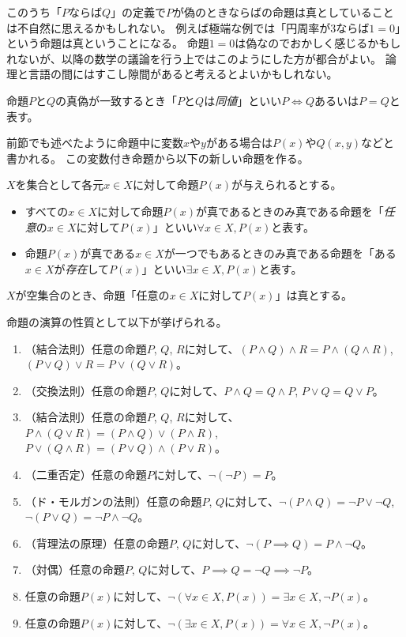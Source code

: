 このうち「$P$ならば$Q$」の定義で$P$が偽のときならばの命題は真としていることは不自然に思えるかもしれない。
例えば極端な例では「円周率が$3$ならば$1 = 0$」という命題は真ということになる。
命題$1 = 0$は偽なのでおかしく感じるかもしれないが、以降の数学の議論を行う上ではこのようにした方が都合がよい。
論理と言語の間にはすこし隙間があると考えるとよいかもしれない。


命題$P$と$Q$の真偽が一致するとき「$P$と$Q$は\emph{同値}」といい$P \iff Q$あるいは$P = Q$と表す。

前節でも述べたように命題中に変数$x$や$y$がある場合は$P(x)$や$Q(x, y)$などと書かれる。
この変数付き命題から以下の新しい命題を作る。

\begin{definition}[全称と存在]
$X$を集合として各元$x \in X$に対して命題$P(x)$が与えられるとする。
\begin{itemize}
\item
すべての$x \in X$に対して命題$P(x)$が真であるときのみ真である命題を「\emph{任意}の$x \in X$に対して$P(x)$」といい$\forall x \in X, P(x)$と表す。
\item
命題$P(x)$が真である$x \in X$が一つでもあるときのみ真である命題を「ある$x \in X$が\emph{存在}して$P(x)$」といい$\exists x \in X, P(x)$と表す。
\end{itemize}
\end{definition}

\begin{remark}
$X$が空集合のとき、命題「任意の$x \in X$に対して$P(x)$」は真とする。
\end{remark}

命題の演算の性質として以下が挙げられる。
\begin{enumerate}
\item
（結合法則）任意の命題$P$, $Q$, $R$に対して、$(P \land Q) \land R = P \land (Q \land R)$, $(P \lor Q) \lor R = P \lor (Q \lor R)$。
\item
（交換法則）任意の命題$P$, $Q$に対して、$P \land Q = Q \land P$, $P \lor Q = Q \lor P$。
\item
（結合法則）任意の命題$P$, $Q$, $R$に対して、$P \land (Q \lor R) = (P \land Q) \lor (P \land R)$, $P \lor (Q \land R) = (P \lor Q) \land (P \lor R)$。
\item
（二重否定）任意の命題$P$に対して、$\neg (\neg P) = P$。
\item
（ド・モルガンの法則）任意の命題$P$, $Q$に対して、$\neg (P \land Q) = \neg P \lor \neg Q$, $\neg (P \lor Q) = \neg P \land \neg Q$。
\item
（背理法の原理）任意の命題$P$, $Q$に対して、$\neg (P \implies Q) = P \land \neg Q$。
\item
（対偶）任意の命題$P$, $Q$に対して、$P \implies Q = \neg Q \implies \neg P$。
\item
任意の命題$P(x)$に対して、$\neg (\forall x \in X, P(x)) = \exists x \in X, \neg P(x)$。
\item
任意の命題$P(x)$に対して、$\neg (\exists x \in X, P(x)) = \forall x \in X, \neg P(x)$。
\end{enumerate}

